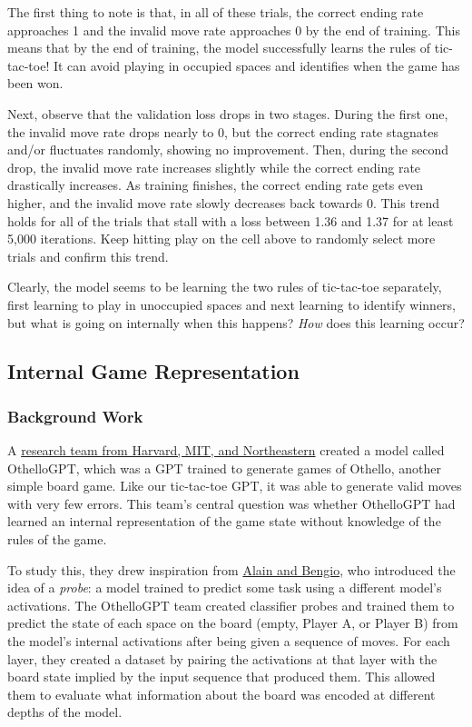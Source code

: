 \documentclass[11pt]{article}
\begin{document}
    The first thing to note is that, in all of these trials, the correct
ending rate approaches 1 and the invalid move rate approaches 0 by the
end of training. This means that by the end of training, the model
successfully learns the rules of tic-tac-toe! It can avoid playing in
occupied spaces and identifies when the game has been won.

Next, observe that the validation loss drops in two stages. During the
first one, the invalid move rate drops nearly to 0, but the correct
ending rate stagnates and/or fluctuates randomly, showing no
improvement. Then, during the second drop, the invalid move rate
increases slightly while the correct ending rate drastically increases.
As training finishes, the correct ending rate gets even higher, and the
invalid move rate slowly decreases back towards 0. This trend holds for
all of the trials that stall with a loss between 1.36 and 1.37 for at
least 5,000 iterations. Keep hitting play on the cell above to randomly
select more trials and confirm this trend.

Clearly, the model seems to be learning the two rules of tic-tac-toe
separately, first learning to play in unoccupied spaces and next
learning to identify winners, but what is going on internally when this
happens? \emph{How} does this learning occur?

    \subsection{Internal Game
Representation}\label{internal-game-representation}

\subsubsection{Background Work}\label{background-work}

A \href{https://arxiv.org/abs/2210.13382}{research team from Harvard,
MIT, and Northeastern} created a model called OthelloGPT, which was a
GPT trained to generate games of Othello, another simple board game.
Like our tic-tac-toe GPT, it was able to generate valid moves with very
few errors. This team's central question was whether OthelloGPT had
learned an internal representation of the game state without knowledge
of the rules of the game.

To study this, they drew inspiration from \href{https://arxiv.org/abs/1610.01644}{Alain and Bengio}, who introduced the idea of a \emph{probe}: a model trained to predict some task using a different model's activations. The OthelloGPT team created classifier probes and trained them to predict the state of each space on the board (empty, Player A, or Player B) from the model’s internal activations after being given a sequence of moves. For each layer, they created a dataset by pairing the activations at that layer with the board state implied by the input sequence that produced them. This allowed them to evaluate what information about the board was encoded at different depths of the model.
\end{document}
